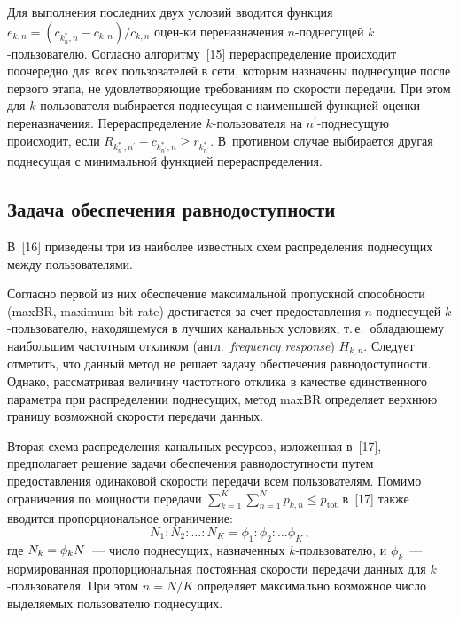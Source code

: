 \begin{multicols}{2}
  Для выполнения последних двух условий вводится функция $e_{k,n}= (c_{k_n^*,n}-
c_{k,n})/c_{k,n}$ оцен-\linebreak ки переназначения $n$-поднесущей $k$-пользователю.\linebreak
 Согласно 
алгоритму~[15] перераспределение происходит поочередно для всех пользователей в сети, 
которым назначены поднесущие после первого этапа, не удовлетворяющие требованиям 
по скорости передачи. При этом для $k$-поль\-зо\-ва\-те\-ля выбирается поднесущая с 
наименьшей функцией оценки переназначения. Перераспределение $k$-поль\-зо\-ва\-те\-ля на 
$n^\prime$-под\-не\-су\-щую происходит, если $R_{k^*_{n^\prime},n^\prime}-
c_{k^*_{n^\prime},n}\geq r_{k^*_{n^\prime}}$. В~противном случае выбирается другая 
поднесущая с минимальной функцией перераспределения.

\subsection{Задача обеспечения равнодоступности}

  В~[16] приведены три из наиболее известных схем распределения поднесущих между 
пользователями. 

Согласно первой из них обеспечение максимальной пропускной 
способности (maxBR, maximum bit-rate) достигается за счет предоставления\linebreak 
  $n$-поднесущей $k$-пользователю, находящемуся в лучших канальных условиях, т.\,е.\ 
обладающему наибольшим частотным откликом (англ.\ \textit{frequency response}) 
$H_{k,n}$. Следует отметить, что данный метод не решает задачу обеспечения 
равнодоступности. Однако, рассматривая величину частотного отклика в качестве 
единственного параметра при распределении поднесущих, метод maxBR определяет 
верхнюю границу возможной скорости передачи данных.
  
  Вторая схема распределения канальных ресурсов, изложенная в~[17], предполагает 
решение задачи обеспечения равнодоступности путем предо\-став\-ле\-ния одинаковой 
скорости передачи всем пользователям. Помимо ограничения по мощности передачи 
$\sum\limits_{k=1}^K \sum\limits_{n=1}^N p_{k,n}\leq p_{\mathrm{tot}}$ в~[17] также вводится 
пропорциональное ограничение: 
$$
N_1:N_2:\ldots:N_K=\phi_1:\phi_2:\ldots\phi_K\,,
$$ 
где 
$N_k\hm=\phi_kN$~--- чис\-ло поднесущих, назначенных $k$-поль\-зо\-ва\-те\-лю, и $\phi_k$~--- 
нормированная пропорциональная постоянная скорости передачи данных для 
  $k$-поль\-зо\-ва\-те\-ля. При этом $\tilde{n}=N/K$ определяет максимально возможное чис\-ло 
выделяемых пользователю поднесущих.
  

\end{multicols}
